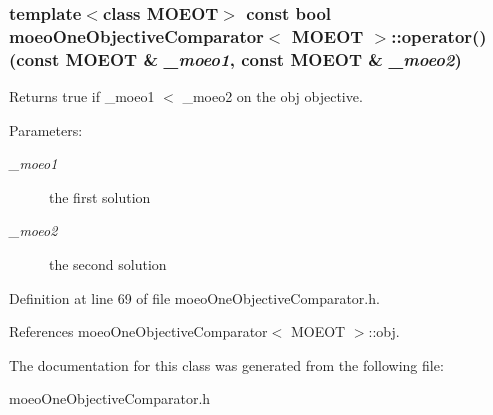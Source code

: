 \subsubsection{\setlength{\rightskip}{0pt plus 5cm}template$<$class MOEOT$>$ const bool \bf{moeo\-One\-Objective\-Comparator}$<$ MOEOT $>$::operator() (const MOEOT \& {\em \_\-moeo1}, const MOEOT \& {\em \_\-moeo2})\hspace{0.3cm}{\tt  [inline]}}\label{classmoeoOneObjectiveComparator_962a4cbc308c30a83c9c485a79374f6a}


Returns true if \_\-moeo1 $<$ \_\-moeo2 on the obj objective. 

\begin{Desc}
\item[Parameters:]
\begin{description}
\item[{\em \_\-moeo1}]the first solution \item[{\em \_\-moeo2}]the second solution \end{description}
\end{Desc}


Definition at line 69 of file moeo\-One\-Objective\-Comparator.h.

References moeo\-One\-Objective\-Comparator$<$ MOEOT $>$::obj.

The documentation for this class was generated from the following file:\begin{CompactItemize}
\item 
moeo\-One\-Objective\-Comparator.h\end{CompactItemize}
